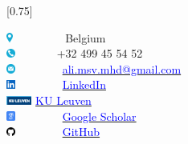 \documentclass[lighthipster]{simplehipstercv}
\begin{document}
	\setlength{\columnsep}{1.5cm}
	[0.75]
	\begin{paracol}{2}
		
		\paracolbackgroundoptions
		
		
		
		\footnotesize
		{\setasidefontcolour
			\flushleft
			\begin{center}
			\end{center}
			
			\includegraphics[height = 0.3cm]{files/location.pdf} ~~~~~~~~ Belgium \\
			\includegraphics[height = 0.3cm]{files/telephone.pdf} ~~~~~~ +32 499 45 54 52 \\
			\includegraphics[height = 0.3cm]{files/email.pdf} ~~~~~~~ \href{mailto:ali.msv.mhd@gmail.com}{\textcolor{blue}{ali.msv.mhd@gmail.com}} \\
			\includegraphics[height = 0.3cm]{files/linkedin_small.pdf} ~~~~~~~ \href{https://www.linkedin.com/in/seyyedalimousavimohammadi/}{\textcolor{blue}{LinkedIn}} \\
			\includegraphics[height = 0.3cm]{files/kuleuven.png} \hspace{0.001em} \href{https://www.kuleuven.be/wieiswie/en/person/00130563}{\textcolor{blue}{KU Leuven}} \\
			\includegraphics[height = 0.3cm]{files/google_scholar.pdf} ~~~~~~~ \href{https://scholar.google.com/citations?user=3fdeWbAAAAAJ&hl=en}{\textcolor{blue}{Google Scholar}} \\
			\includegraphics[height = 0.3cm]{files/github.png} ~~~~~~~ \href{https://github.com/alimousavimohammadi}{\textcolor{blue}{GitHub}}
			
}
\end{paracol}
\end{document}
